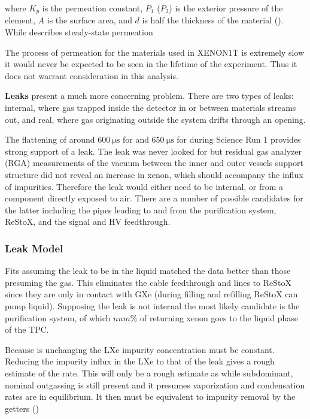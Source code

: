 \noindent where $K_p$ is the permeation constant, $P_1$ ($P_2$) is the exterior pressure of the element, $A$ is the surface area, and
$d$ is half the thickness of the material ().  While 
describes steady-state permeation 

The process of permeation for the materials used in XENON1T is extremely slow it would never be expected to be seen in the lifetime of the
experiment.  Thus it does not warrant consideration in this analysis.

\textbf{Leaks} present a much more concerning problem.  There are two types of leaks: internal, where gas trapped inside the detector
in or between materials streams out, and real, where gas originating outside the system drifts through an opening.

The flattening of \te around $600\ \mathrm{\mu s}$ for \alphadecays and $650\ \mathrm{\mu s}$ for \metakr during Science Run 1 provides
strong support of a leak.  The leak was never looked for but residual gas analyzer (RGA) measurements of the vacuum between the inner and
outer vessels support structure did not reveal an increase in xenon, which should accompany the influx of impurities.  Therefore the
leak would either need to be internal, or from a component directly exposed to air.  There are a number of possible candidates for the
latter including the pipes leading to and from the purification system, ReStoX, and the signal and HV feedthrough.



\subsubsection{Leak Model}
\label{subsubsec:electron_lifetime_model_outgassing_leak_model}
Fits assuming the leak to be in the liquid matched the data better than those presuming the gas.  This eliminates the cable feedthrough
and lines to ReStoX since they are only in contact with GXe (during filling and refilling ReStoX can pump liquid).  Supposing the leak is
not internal the most likely candidate is the purification system, of which $num\%$ of returning xenon goes to the liquid phase of the
TPC.

Because \te is unchanging the LXe impurity concentration must be constant.  Reducing the impurity influx in the LXe to that of the leak
gives a rough estimate of the rate.  This will only be a rough estimate as while subdominant, nominal outgassing is still present and
it presumes vaporization and condensation rates are in equilibrium.  It then must be equivalent to impurity removal by the getters
()

